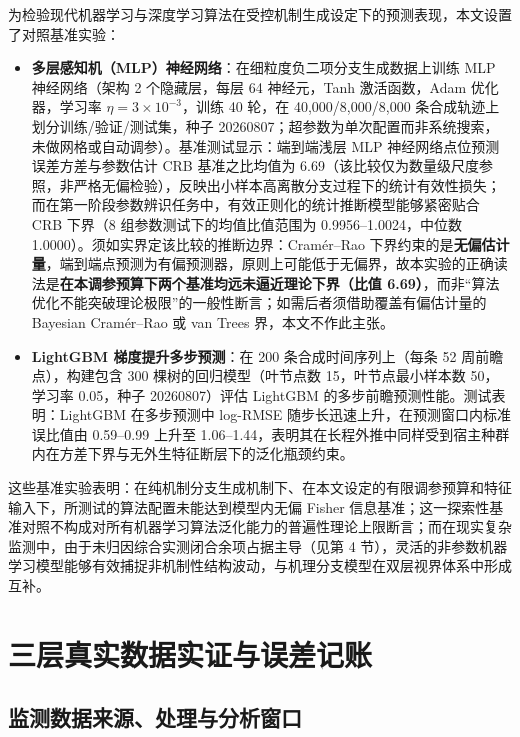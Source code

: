 \documentclass[11pt,a4paper]{article}
\theoremstyle{plain}
\theoremstyle{definition}
\begin{document}
为检验现代机器学习与深度学习算法在受控机制生成设定下的预测表现，本文设置了对照基准实验：
\begin{itemize}
\item \textbf{多层感知机（MLP）神经网络}：在细粒度负二项分支生成数据上训练 MLP 神经网络（架构 2 个隐藏层，每层 64 神经元，Tanh 激活函数，Adam 优化器，学习率 $\eta=3\times 10^{-3}$，训练 40 轮，在 40,000/8,000/8,000 条合成轨迹上划分训练/验证/测试集，种子 20260807；超参数为单次配置而非系统搜索，未做网格或自动调参）。基准测试显示：端到端浅层 MLP 神经网络点位预测误差方差与参数估计 CRB 基准之比均值为 6.69（该比较仅为数量级尺度参照，非严格无偏检验），反映出小样本高离散分支过程下的统计有效性损失；而在第一阶段参数辨识任务中，有效正则化的统计推断模型能够紧密贴合 CRB 下界（8 组参数测试下的均值比值范围为 0.9956--1.0024，中位数 1.0000）。须如实界定该比较的推断边界：Cram\'er--Rao 下界约束的是\textbf{无偏估计量}，端到端点预测为有偏预测器，原则上可能低于无偏界，故本实验的正确读法是\textbf{在本调参预算下两个基准均远未逼近理论下界（比值 6.69）}，而非“算法优化不能突破理论极限”的一般性断言；如需后者须借助覆盖有偏估计量的 Bayesian Cram\'er--Rao 或 van Trees 界，本文不作此主张。
\item \textbf{LightGBM 梯度提升多步预测}：在 200 条合成时间序列上（每条 52 周前瞻点），构建包含 300 棵树的回归模型（叶节点数 15，叶节点最小样本数 50，学习率 0.05，种子 20260807）评估 LightGBM 的多步前瞻预测性能。测试表明：LightGBM 在多步预测中 log-RMSE 随步长迅速上升，在预测窗口内标准误比值由 0.59--0.99 上升至 1.06--1.44，表明其在长程外推中同样受到宿主种群内在方差下界与无外生特征断层下的泛化瓶颈约束。
\end{itemize}

这些基准实验表明：在纯机制分支生成机制下、在本文设定的有限调参预算和特征输入下，所测试的算法配置未能达到模型内无偏 Fisher 信息基准；这一探索性基准对照不构成对所有机器学习算法泛化能力的普遍性理论上限断言；而在现实复杂监测中，由于未归因综合实测闭合余项占据主导（见第 4 节），灵活的非参数机器学习模型能够有效捕捉非机制性结构波动，与机理分支模型在双层视界体系中形成互补。

\section{三层真实数据实证与误差记账}

\subsection{监测数据来源、处理与分析窗口}\label{sec:data}
\end{document}
